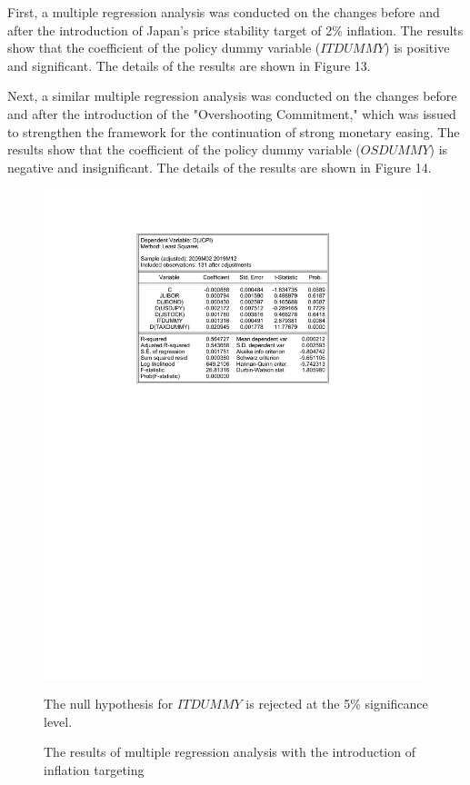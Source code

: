 \documentclass[12pt]{article}
\begin{document}
First, a multiple regression analysis was conducted on the changes before and after the introduction of Japan's price stability target of 2\% inflation.
The results show that the coefficient of the policy dummy variable ($ITDUMMY$) is positive and significant. The details of the results are shown in Figure 13.

Next, a similar multiple regression analysis was conducted on the changes before and after the introduction of the "Overshooting Commitment," which was issued to strengthen the framework for the continuation of strong monetary easing.
The results show that the coefficient of the policy dummy variable ($OSDUMMY$) is negative and insignificant. The details of the results are shown in Figure 14.

\newpage

\begin{figure}[!htbp]
    \centering
    \caption{The results of multiple regression analysis with the introduction of inflation targeting}
    \vspace{5pt}
    \includegraphics[width=11cm]{it.pdf}

    The null hypothesis for $ITDUMMY$ is rejected at the 5\% significance level.
\end{figure}
\end{document}
